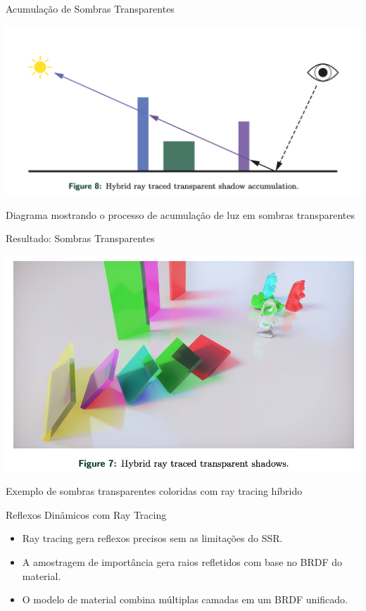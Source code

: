 \documentclass[aspectratio=169,xcolor=table]{beamer}
\begin{document}
\begin{frame}{Acumulação de Sombras Transparentes}
    \begin{center}
        \includegraphics[height=0.7\textheight]{shadow-accumulation}
    \end{center}
    \begin{center}
        \small{Diagrama mostrando o processo de acumulação de luz em sombras transparentes}
    \end{center}
\end{frame}

\begin{frame}{Resultado: Sombras Transparentes}
    \begin{center}
        \includegraphics[height=0.8\textheight]{transparent-shadow}
    \end{center}
    \begin{center}
        \small{Exemplo de sombras transparentes coloridas com ray tracing híbrido}
    \end{center}
\end{frame}

\begin{frame}{Reflexos Dinâmicos com Ray Tracing}
    \begin{itemize}
        \item Ray tracing gera reflexos precisos sem as limitações do SSR.
        \item A amostragem de importância gera raios refletidos com base no BRDF do material.
        \item O modelo de material combina múltiplas camadas em um BRDF unificado.
    \end{itemize}
\end{frame}
\end{document}

